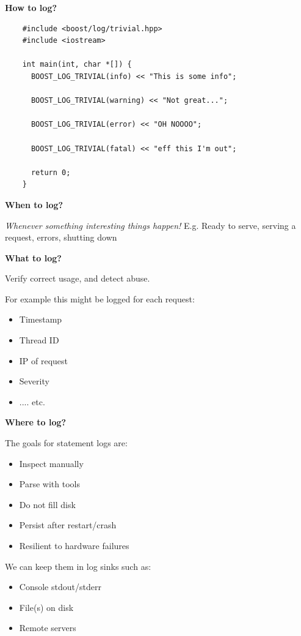 \documentclass{article}
\begin{document}
\vspace*{2em}

\textbf{How to log?}
\begin{verbatim}
    #include <boost/log/trivial.hpp>
    #include <iostream>
    
    int main(int, char *[]) {
      BOOST_LOG_TRIVIAL(info) << "This is some info";
    
      BOOST_LOG_TRIVIAL(warning) << "Not great...";
    
      BOOST_LOG_TRIVIAL(error) << "OH NOOOO";
    
      BOOST_LOG_TRIVIAL(fatal) << "eff this I'm out";
    
      return 0;
    }    
\end{verbatim}

\textbf{When to log?}

\textit{Whenever something interesting things happen!} E.g. Ready to serve, serving a request, errors, shutting down

\vspace*{1em}

\textbf{What to log?}

Verify correct usage, and detect abuse.

For example this might be logged for each request:
\begin{itemize}
    \item Timestamp 
    \item Thread ID 
    \item IP of request 
    \item Severity
    \item .... etc.
\end{itemize}

\vspace*{1em} 

\textbf{Where to log?}

The goals for statement logs are:
\begin{itemize}
    \item Inspect manually 
    \item Parse with tools 
    \item Do not fill disk 
    \item Persist after restart/crash 
    \item Resilient to hardware failures 
\end{itemize}

We can keep them in log sinks such as:
\begin{itemize}
    \item Console stdout/stderr 
    \item File(s) on disk 
    \item Remote servers 
\end{itemize}
\end{document}
